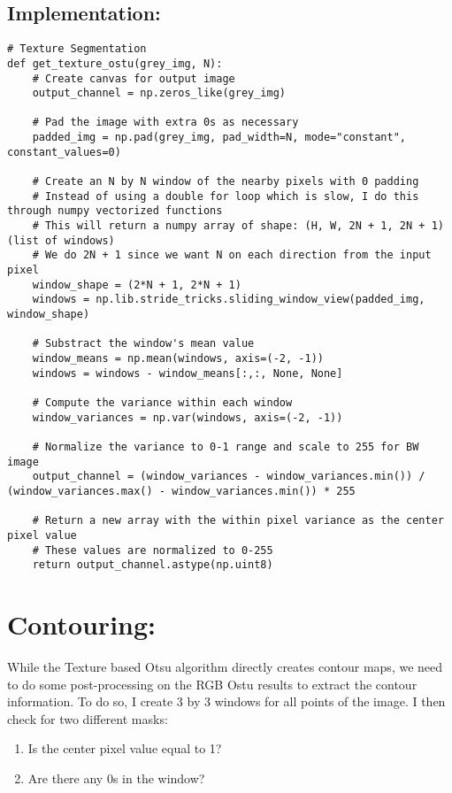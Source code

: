 \documentclass{article}
\begin{document}
\subsection{Implementation:}
\begin{lstlisting}
# Texture Segmentation
def get_texture_ostu(grey_img, N):
    # Create canvas for output image
    output_channel = np.zeros_like(grey_img)
    
    # Pad the image with extra 0s as necessary
    padded_img = np.pad(grey_img, pad_width=N, mode="constant", constant_values=0)
    
    # Create an N by N window of the nearby pixels with 0 padding
    # Instead of using a double for loop which is slow, I do this through numpy vectorized functions
    # This will return a numpy array of shape: (H, W, 2N + 1, 2N + 1) (list of windows)
    # We do 2N + 1 since we want N on each direction from the input pixel
    window_shape = (2*N + 1, 2*N + 1)
    windows = np.lib.stride_tricks.sliding_window_view(padded_img, window_shape)
    
    # Substract the window's mean value
    window_means = np.mean(windows, axis=(-2, -1))
    windows = windows - window_means[:,:, None, None]
    
    # Compute the variance within each window
    window_variances = np.var(windows, axis=(-2, -1))
    
    # Normalize the variance to 0-1 range and scale to 255 for BW image
    output_channel = (window_variances - window_variances.min()) / (window_variances.max() - window_variances.min()) * 255

    # Return a new array with the within pixel variance as the center pixel value
    # These values are normalized to 0-255
    return output_channel.astype(np.uint8)
\end{lstlisting}

\section{Contouring:}
While the Texture based Otsu algorithm directly creates contour maps, we need to do some post-processing on the RGB Ostu results
to extract the contour information. To do so, I create 3 by 3 windows for all points of the image. I then check for two different masks:
\begin{enumerate}
    \item Is the center pixel value equal to 1?
    \item Are there any 0s in the window?
\end{enumerate}
\end{document}
